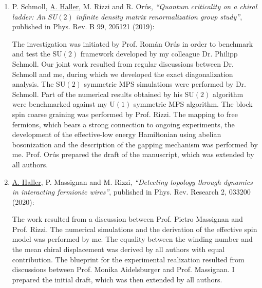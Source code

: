 \begin{enumerate}
    \item{P. Schmoll, \underline{A. Haller}, M. Rizzi and R. Orús, {\it ``Quantum criticality on a chiral ladder: An SU$(2)$ infinite density matrix renormalization group study''}, published in Phys. Rev. B 99, 205121 (2019):
    
    The investigation was initiated by Prof. Román Orús in order to benchmark and test the SU$(2)$ framework developed by my colleague Dr. Philipp Schmoll. Our joint work resulted from regular discussions between Dr. Schmoll and me, during which we developed the exact diagonalization analysis. The SU$(2)$ symmetric MPS simulations were performed by Dr. Schmoll. Part of the numerical results obtained by his SU$(2)$ algorithm were benchmarked against my U$(1)$ symmetric MPS algorithm. The block spin coarse graining was performed by Prof. Rizzi. The mapping to free fermions, which bears a strong connection to ongoing experiments, the development of the effective-low energy Hamiltonian using abelian bosonization and the description of the gapping mechanism was performed by me. Prof. Orús prepared the draft of the manuscript, which was extended by all authors.}\bigskip
    
    \item{\underline{A. Haller}, P. Massignan and M. Rizzi, {\it ``Detecting topology through dynamics in interacting fermionic wires''}, published in Phys. Rev. Research 2, 033200 (2020):
    
    The work resulted from a discussion between Prof. Pietro Massignan and Prof. Rizzi. The numerical simulations and the derivation of the effective spin model was performed by me. The equality between the winding number and the mean chiral displacement was derived by all authors with equal contribution. The blueprint for the experimental realization resulted from discussions between Prof. Monika Aidelsburger and Prof. Massignan. I prepared the initial draft, which was then extended by all authors.}
\end{enumerate}


